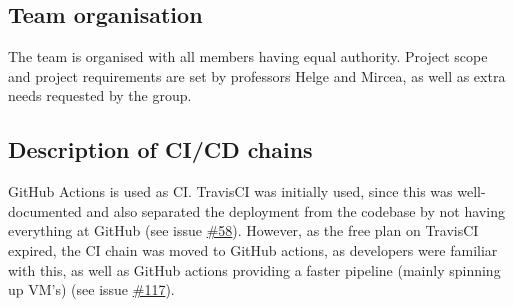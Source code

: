 

\subsection{Team organisation}
The team is organised with all members having equal authority. Project scope and project requirements are set by professors Helge and Mircea, as well as extra needs requested by the group. 

\subsection{Description of CI/CD chains}
GitHub Actions is used as CI. TravisCI was initially used, since this was well-documented and also separated the deployment from the codebase by not having everything at GitHub (see issue \href{https://github.com/DevelOpsITU/MiniTwit/issues/58}{\#58}). However, as the free plan on TravisCI expired, the CI chain was moved to GitHub actions, as developers were familiar with this, as well as GitHub actions providing a faster pipeline (mainly spinning up VM's) (see issue \href{https://github.com/DevelOpsITU/MiniTwit/issues/117}{\#117}).\\

